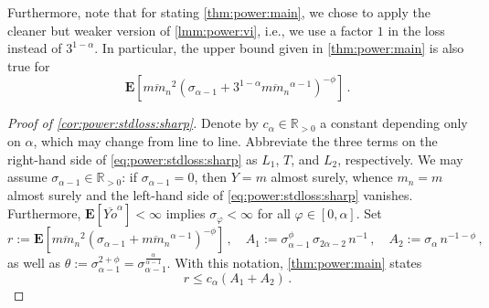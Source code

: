 \documentclass{article}
\newcommand{\R}{\mathbb{R}}
\newcommand{\Rpp}{\R_{>0}}
\newcommand{\lab}{\left[} %
\newcommand{\rab}{\right]} %
\newcommand{\ab}[1]{\lab #1 \rab} %
\newcommand{\abOf}[1]{\!\ab{#1}} %
\newcommand{\lb}{\left(} %
\newcommand{\rb}{\right)} %
\newcommand{\br}[1]{\lb #1 \rb} %
\newcommand{\E}{\mathbf{E}} %
\newcommand{\Eof}[1]{\E[#1]}
\newcommand{\EOf}[1]{\E\abOf{#1}}
\newcommand{\eqcm}{\,,} %
\newcommand{\eqfs}{\,.}
\newcommand{\ol}[2]{\overline{#1#2}}
\begin{document}
\begin{remark}
    Furthermore, note that for stating \cref{thm:power:main}, we chose to apply the cleaner but weaker version of \cref{lmm:power:vi}, i.e., we use a factor $1$ in the loss instead of $3^{1-\alpha}$. In particular, the upper bound given in \cref{thm:power:main} is also true for
    \begin{equation}
        \EOf{\ol{m}{m_n}^2 \br{\sigma_{\alpha-1} + 3^{1-\alpha}\ol{m}{m_n}^{\alpha-1}}^{-\phi}}
        \eqfs
    \end{equation}
\end{remark}
%
%
\begin{proof}[Proof of \cref{cor:power:stdloss:sharp}]
     Denote by $c_\alpha\in\Rpp$ a constant depending only on $\alpha$, which may change from line to line.
     Abbreviate the three terms on the right-hand side of \eqref{eq:power:stdloss:sharp} as $L_1$, $T$, and $L_2$, respectively.
     We may assume $\sigma_{\alpha-1}\in\Rpp$: if $\sigma_{\alpha-1} = 0$, then $Y = m$ almost surely, whence $m_n = m$ almost surely and the left-hand side of \eqref{eq:power:stdloss:sharp} vanishes.
     Furthermore, $\Eof{\ol Yo^\alpha}<\infty$ implies $\sigma_\varphi<\infty$ for all $\varphi\in[0,\alpha]$.
     Set
     \begin{equation}
         r := \EOf{\ol{m}{m_n}^2 \br{\sigma_{\alpha-1} + \ol{m}{m_n}^{\alpha-1}}^{-\phi}}
         \eqcm\quad
         A_1 := \sigma_{\alpha-1}^{\phi}\,\sigma_{2\alpha-2}\,n^{-1}
         \eqcm\quad
         A_2 := \sigma_\alpha\, n^{-1-\phi}
         \eqcm
     \end{equation}
     as well as $\theta := \sigma_{\alpha-1}^{2+\phi} = \sigma_{\alpha-1}^{\frac{\alpha}{\alpha-1}}$.
     With this notation, \cref{thm:power:main} states
     \begin{equation}\label{eq:cor:sharp:main}
         r \leq c_\alpha \br{A_1 + A_2}
         \eqfs
     \end{equation}
     

\end{proof}
\end{document}
